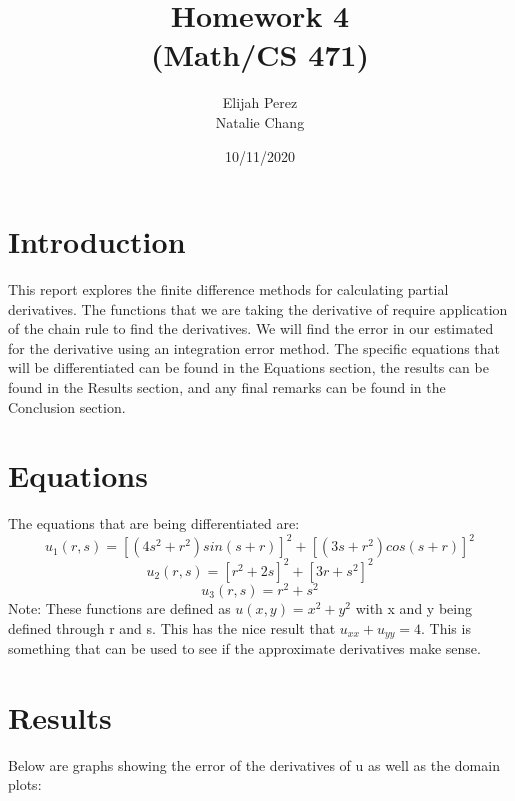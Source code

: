 \documentclass[12pt]{article}
\title{Homework 4 \protect \\(Math/CS 471)}
\author{Elijah Perez \protect \newline \\ Natalie Chang}
\date{\vfill 10/11/2020}
\begin{document}
	\maketitle
	\pagebreak
	
	\section{Introduction}
    This report explores the finite difference methods for calculating partial derivatives. The functions that we are taking the derivative of require application of the chain rule to find the derivatives. We will find the error in our estimated for the derivative using an integration error method. The specific equations that will be differentiated can be found in the Equations section, the results can be found in the Results section, and any final remarks can be found in the Conclusion section.
	
	\section{Equations}
	The equations that are being differentiated are:
	\begin{equation}
		u_1(r,s)=[(4s^2+r^2)sin(s+r)]^2+[(3s+r^2)cos(s+r)]^2
	\end{equation}
	\begin{equation}
		u_2(r,s)=[r^2+2s]^2+[3r+s^2]^2
	\end{equation}
	\begin{equation}
		u_3(r,s)=r^2+s^2 
	\end{equation}	
	Note: These functions are defined as $u(x,y)=x^2+y^2$ with x and y being defined through r and s. This has the nice result that $u_{xx}+u_{yy}=4$. This is something that can be used to see if the approximate derivatives make sense.
	
	\section{Results}
	Below are graphs showing the error of the derivatives of u as well as the domain plots:
	
\end{document}
